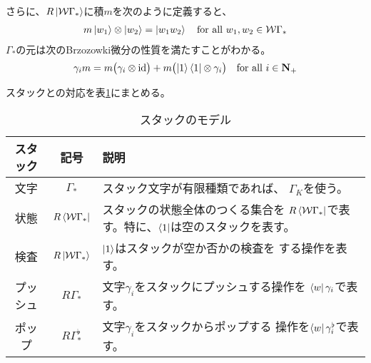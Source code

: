 {	さらに、$R\mathinner{|{{\ensuremath{{\mathcal{W}}}}\Gamma_*}\rangle}$に積$m$を次のように定義すると、
	\begin{equation*}\begin{split}
		m \mathinner{|{w_1}\rangle}\otimes\mathinner{|{w_2}\rangle} = \mathinner{|{w_1w_2}\rangle}
		\quad\text{for all } w_1,w_2\in{\ensuremath{{\mathcal{W}}}}\Gamma_*
	\end{split}\end{equation*}
	$\Gamma_*$の元は次のBrzozowki微分の性質を満たすことがわかる。
	\begin{equation*}\begin{split}
		\gamma_i m =  m\bigl(\gamma_i\otimes{\ensuremath{\operatorname{id}}}\bigr) 
			+  m \bigl(\mathinner{|{1}\rangle}\mathinner{\langle{1}|}\otimes \gamma_i\bigr)
		\quad\text{for all } i\in\mathbf{N}_+
	\end{split}\end{equation*}

	スタックとの対応を表\ref{table:スタックのモデル}にまとめる。
	\begin{table}[htbp] %
		\begin{center}\begin{tabular}{ccp{}} \hline
			スタック & 記号 & 説明 \\ \hline
			文字 & $\Gamma_*$ & スタック文字が有限種類であれば、
				$\Gamma_K$を使う。 \\
			状態 & $R\mathinner{\langle{{\ensuremath{{\mathcal{W}}}}\Gamma_*}|}$ & スタックの状態全体のつくる集合を
				$R\mathinner{\langle{{\ensuremath{{\mathcal{W}}}}\Gamma_*}|}$で表す。特に、$\mathinner{\langle{1}|}$は空のスタックを表す。\\
			検査 & $R\mathinner{|{{\ensuremath{{\mathcal{W}}}}\Gamma_*}\rangle}$ & $\mathinner{|{1}\rangle}$はスタックが空か否かの検査を
				する操作を表す。\\
			プッシュ & $R\Gamma_*$ & 文字$\gamma_i$をスタックにプッシュする操作を
				$\mathinner{\langle{w}|}\gamma_i$で表す。\\
			ポップ & $R\Gamma_*^\flat$ & 文字$\gamma_i$をスタックからポップする
				操作を$\mathinner{\langle{w}|}\gamma_i^\flat$で表す。\\
		\end{tabular}\end{center}
		\caption{スタックのモデル}
		\label{table:スタックのモデル}
	\end{table} %
}
